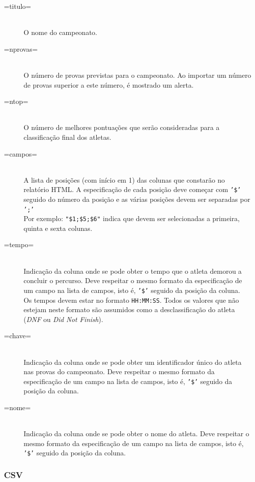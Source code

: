 \documentclass[11pt, a4paper, oneside]{article}
\begin{document}
\begin{description}
\item[=titulo=] \hfill \\
	O nome do campeonato.
\item[=nprovas=] \hfill \\
	O número de provas previstas para o campeonato. Ao importar um número de provas superior a este número, é mostrado um alerta.
\item[=ntop=] \hfill \\
	O número de melhores pontuações que serão consideradas para a classificação final dos atletas.
\item[=campos=] \hfill \\
	A lista de posições (com início em 1) das colunas que constarão no relatório HTML. A especificação de cada posição deve começar com \texttt{'\$'} seguido do número da posição e as várias posições devem ser separadas por \texttt{';'}\\
	Por exemplo: \texttt{"\$1;\$5;\$6"} indica que devem ser selecionadas a primeira, quinta e sexta colunas.
\item[=tempo=] \hfill \\
	Indicação da coluna onde se pode obter o tempo que o atleta demorou a concluir o percurso. Deve respeitar o mesmo formato da especificação de um campo na lista de campos, isto é, \texttt{'\$'} seguido da posição da coluna.\\
	Os tempos devem estar no formato \texttt{HH:MM:SS}. Todos os valores que não estejam neste formato são assumidos como a desclassificação do atleta (\emph{DNF} ou \emph{Did Not Finish}).
\item[=chave=] \hfill \\
	Indicação da coluna onde se pode obter um identificador único do atleta nas provas do campeonato. Deve respeitar o mesmo formato da especificação de um campo na lista de campos, isto é, \texttt{'\$'} seguido da posição da coluna.
\item[=nome=] \hfill \\
	Indicação da coluna onde se pode obter o nome do atleta. Deve respeitar o mesmo formato da especificação de um campo na lista de campos, isto é, \texttt{'\$'} seguido da posição da coluna.
\end{description}

\subsubsection{CSV}
\end{document}
